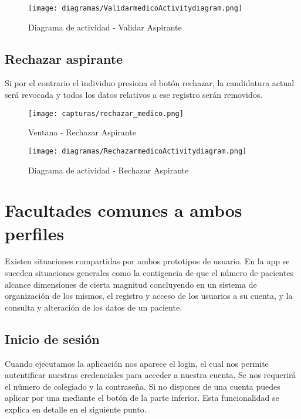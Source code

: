 \documentclass[11pt,spanish,
		listoftables,listoffigures]
		{tfgplantilla}
\begin{document}
\begin{figure}[H]
\centering
\texttt{[image: diagramas/ValidarmedicoActivitydiagram.png]}
\caption{Diagrama de actividad -  Validar Aspirante}
\end{figure}

\vfill
\subsection {Rechazar aspirante}

Si por el contrario el individuo presiona el botón rechazar, la candidatura actual será revocada y todos los datos relativos a ese registro serán removidos. 

\begin{figure}[H]
\centering
\texttt{[image: capturas/rechazar\_medico.png]}
\caption{Ventana -  Rechazar Aspirante}
\end{figure}

\begin{figure}[H]
\centering
\texttt{[image: diagramas/RechazarmedicoActivitydiagram.png]}
\caption{Diagrama de actividad -  Rechazar Aspirante}
\end{figure}

\vfill
\section {Facultades comunes a ambos perfiles}

Existen situaciones compartidas por ambos prototipos de usuario. En la app se suceden situaciones generales como la contigencia de que el número de pacientes alcance dimensiones de cierta magnitud concluyendo en un sistema de organización de los mismos, el registro y acceso de los usuarios a su cuenta, y la consulta y alteración de los datos de un paciente.

\subsection {Inicio de sesión}

Cuando ejecutamos la aplicación nos aparece el login, el cual nos permite autentificar nuestras credenciales para acceder a nuestra cuenta. Se nos requerirá el número de colegiado y la contraseña.
Si no dispones de una cuenta puedes aplicar por una mediante el botón de la parte inferior. Esta funcionalidad se explica en detalle en el siguiente punto.
\end{document}

